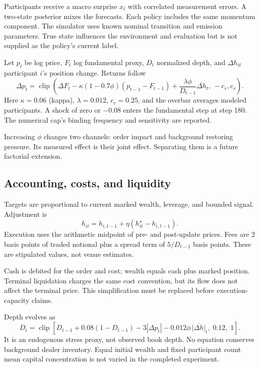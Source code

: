 Participants receive a macro surprise $x_t$ with correlated measurement errors. A two-state posterior mixes the forecasts. Each policy includes the same momentum component. The simulator uses known nominal transition and emission parameters. True state influences the environment and evaluation but is not supplied as the policy's current label.

Let $p_t$ be log price, $F_t$ log fundamental proxy, $D_t$ normalized depth, and $\Delta h_{it}$ participant $i$'s position change. Returns follow
\begin{equation}
\Delta p_t=\operatorname{clip}\!\left(
\Delta F_t-\kappa(1-0.7\phi)(p_{t-1}-F_{t-1})
+\frac{\lambda\phi}{D_{t-1}}\overline{\Delta h}_t,\,-c_r,c_r\right).
\label{eq:market}
\end{equation}
Here $\kappa=0.06$ (kappa), $\lambda=0.012$, $c_r=0.25$, and the overbar averages modeled participants. A shock of zero or $-0.08$ enters the fundamental step at step 180. The numerical cap's binding frequency and sensitivity are reported.

Increasing $\phi$ changes two channels: order impact and background restoring pressure. Its measured effect is their joint effect. Separating them is a future factorial extension.

\subsection{Accounting, costs, and liquidity}
Targets are proportional to current marked wealth, leverage, and bounded signal. Adjustment is
\[
h_{it}=h_{i,t-1}+\eta(h^\star_{it}-h_{i,t-1}).
\]
Execution uses the arithmetic midpoint of pre- and post-update prices. Fees are 2 basis points of traded notional plus a spread term of $5/D_{t-1}$ basis points. These are stipulated values, not venue estimates.

Cash is debited for the order and cost; wealth equals cash plus marked position. Terminal liquidation charges the same cost convention, but its flow does not affect the terminal price. This simplification must be replaced before execution-capacity claims.

Depth evolves as
\[
D_t=\operatorname{clip}\!\left[
D_{t-1}+0.08(1-D_{t-1})-3|\Delta p_t|
-0.012\phi\,\overline{|\Delta h|}_t,\;0.12,\;1\right].
\]
It is an endogenous stress proxy, not observed book depth. No equation conserves background dealer inventory. Equal initial wealth and fixed participant count mean capital concentration is not varied in the completed experiment.

